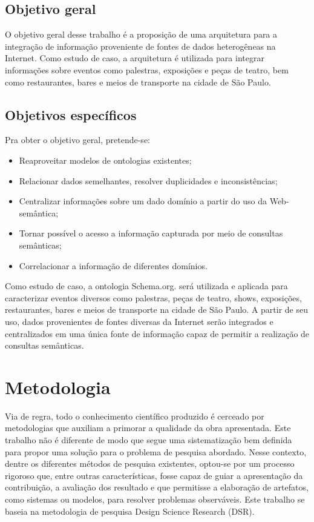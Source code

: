\subsection{Objetivo geral}
\label{sec:objetivo_geral}

O objetivo geral desse trabalho é a proposição de uma arquitetura para a integração de informação proveniente de fontes de dados heterogêneas na Internet. Como estudo de caso, a arquitetura é utilizada para integrar informações sobre eventos como palestras, exposições e peças de teatro, bem como restaurantes, bares e meios de transporte na cidade de São Paulo.  

\subsection{Objetivos específicos}
\label{sec:objetivos_especificos}

Pra obter o objetivo geral, pretende-se:
\begin{itemize}
    \item Reaproveitar modelos de ontologias existentes;
    \item Relacionar dados semelhantes, resolver duplicidades e inconsistências;
    \item Centralizar informações sobre um dado domínio a partir do uso da Web-semântica;
    \item Tornar possível o acesso a informação capturada por meio de consultas semânticas;
    \item Correlacionar a informação de diferentes domínios.
\end{itemize}

Como estudo de caso, a ontologia Schema.org. será utilizada e aplicada para caracterizar eventos diversos como palestras, peças de teatro, shows, exposições, restaurantes, bares e meios de transporte na cidade de São Paulo. A partir de seu uso, dados provenientes de fontes diversas da Internet serão integrados e centralizados em uma única fonte de informação capaz de permitir a realização de consultas semânticas.

\section{Metodologia}
\label{sec:metodologia}

Via de regra, todo o conhecimento científico produzido é cerceado por metodologias que auxiliam a primorar a qualidade da obra apresentada. Este trabalho não é diferente de modo que segue uma sistematização bem definida para propor uma solução para o problema de pesquisa abordado. Nesse contexto, dentre os diferentes métodos de pesquisa existentes, optou-se por um processo rigoroso que, entre outras características, fosse capaz de guiar a apresentação da contribuição, a avaliação dos resultado e que permitisse a elaboração de artefatos, como sistemas ou modelos, para resolver problemas observáveis. Este trabalho se baseia na metodologia de pesquisa Design Science Research (DSR).

